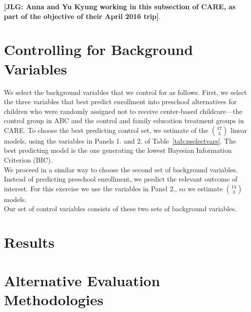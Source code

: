 \begin{appendices}
\noindent \textbf{[JLG: Anna and Yu Kyung working in this subsection of CARE, as part of the objective of their April 2016 trip]}.

\setcounter{figure}{0}  \renewcommand{\thefigure}{B.\arabic{figure}}
\setcounter{table}{0}   \renewcommand{\thetable}{B.\arabic{table}}
\section{Controlling for Background Variables} \label{appendix:controls}

\noindent We select the background variables that we control for as follows. First, we select the three variables that best predict enrollment into preschool alternatives for children who were randomly assigned not to receive center-based childcare---the control group in ABC and the control and family education treatment groups in CARE. To choose the best predicting control set, we estimate of the $17 \choose 3$ linear models, using the variables in Panels 1. and 2. of Table~\ref{tab:pselectvars}. The best predicting model is the one generating the lowest Bayesian Information Criterion (BIC).\\

\noindent We proceed in a similar way to choose the second set of background variables. Instead of predicting preschool enrollment, we predict the relevant outcome of interest. For this exercise we use the variables in Panel 2., so we estimate $14 \choose 3$ models.\\

\noindent Our set of control variables consists of these two sets of background variables.



\setcounter{figure}{0}  \renewcommand{\thefigure}{C.\arabic{figure}}
\setcounter{table}{0}   \renewcommand{\thetable}{C.\arabic{table}}
\section{Results}

\setcounter{figure}{0}  \renewcommand{\thefigure}{E.\arabic{figure}}
\setcounter{table}{0}   \renewcommand{\thetable}{E.\arabic{table}}

\section{Alternative Evaluation Methodologies} \label{appendix:methodology}


\end{appendices}
